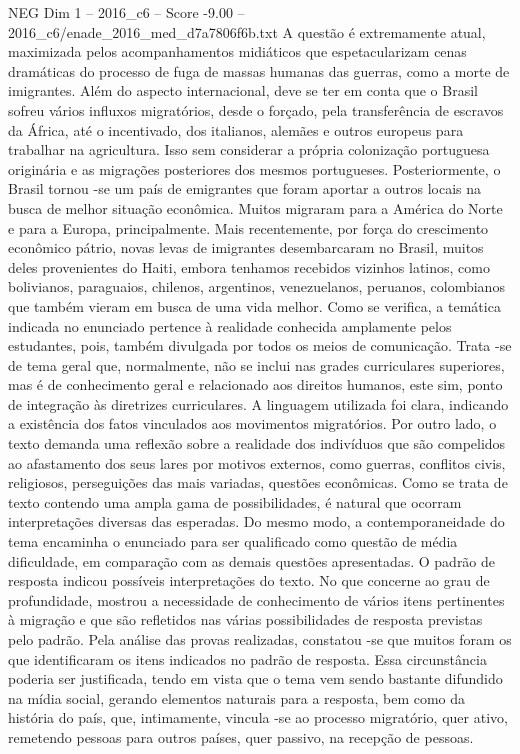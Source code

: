 \begin{textsample}{NEG Dim 1 – 2016\_c6 – Score -9.00 – 2016\_c6/enade\_2016\_med\_d7a7806f6b.txt}
A questão é extremamente atual, maximizada pelos acompanhamentos midiáticos que espetacularizam cenas dramáticas do processo de fuga de massas humanas das guerras, como a morte de imigrantes.
Além do aspecto internacional, deve se ter em conta que o Brasil sofreu vários influxos migratórios, desde o forçado, pela transferência de escravos da África, até o incentivado, dos italianos, alemães e outros europeus para trabalhar na agricultura.
Isso sem considerar a própria colonização portuguesa originária e as migrações posteriores dos mesmos portugueses.
Posteriormente, o Brasil tornou -se um país de emigrantes que foram aportar a outros locais na busca de melhor situação econômica.
Muitos migraram para a América do Norte e para a Europa, principalmente.
Mais recentemente, por força do crescimento econômico pátrio, novas levas de imigrantes desembarcaram no Brasil, muitos deles provenientes do Haiti, embora tenhamos recebidos vizinhos latinos, como bolivianos, paraguaios, chilenos, argentinos, venezuelanos, peruanos, colombianos que também vieram em busca de uma vida melhor.
Como se verifica, a temática indicada no enunciado pertence à realidade conhecida amplamente pelos estudantes, pois, também divulgada por todos os meios de comunicação.
Trata -se de tema geral que, normalmente, não se inclui nas grades curriculares superiores, mas é de conhecimento geral e relacionado aos direitos humanos, este sim, ponto de integração às diretrizes curriculares.
A linguagem utilizada foi clara, indicando a existência dos fatos vinculados aos movimentos migratórios.
Por outro lado, o texto demanda uma reflexão sobre a realidade dos indivíduos que são compelidos ao afastamento dos seus lares por motivos externos, como guerras, conflitos civis, religiosos, perseguições das mais variadas, questões econômicas.
Como se trata de texto contendo uma ampla gama de possibilidades, é natural que ocorram interpretações diversas das esperadas.
Do mesmo modo, a contemporaneidade do tema encaminha o enunciado para ser qualificado como questão de média dificuldade, em comparação com as demais questões apresentadas.
O padrão de resposta indicou possíveis interpretações do texto.
No que concerne ao grau de profundidade, mostrou a necessidade de conhecimento de vários itens pertinentes à migração e que são refletidos nas várias possibilidades de resposta previstas pelo padrão.
Pela análise das provas realizadas, constatou -se que muitos foram os que identificaram os itens indicados no padrão de resposta.
Essa circunstância poderia ser justificada, tendo em vista que o tema vem sendo bastante difundido na mídia social, gerando elementos naturais para a resposta, bem como da história do país, que, intimamente, vincula -se ao processo migratório, quer ativo, remetendo pessoas para outros países, quer passivo, na recepção de pessoas.

\end{textsample}
